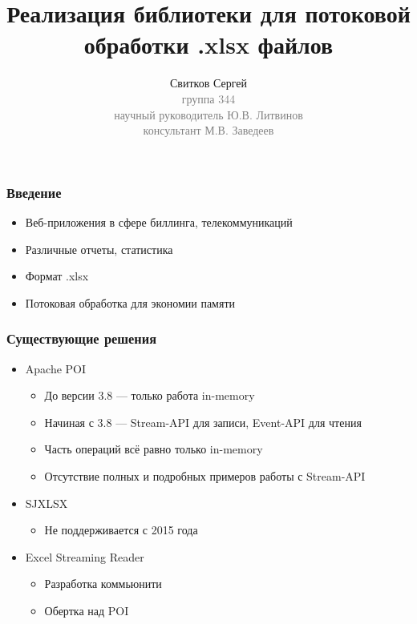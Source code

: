 \documentclass{beamer}
\begin{document}
\title{Реализация библиотеки для потоковой обработки .xlsx файлов}
\author{Свитков Сергей\\{\footnotesize\textcolor{gray}{группа 344\\научный руководитель Ю.В. Литвинов\\консультант М.В. Заведеев}}}
\frame{\titlepage}

\begin{frame}\frametitle{Введение}
\begin{itemize}
    \item Веб-приложения в сфере биллинга, телекоммуникаций
    \item Различные отчеты, статистика
    \item Формат .xlsx
    \item Потоковая обработка для экономии памяти
\end{itemize}
\end{frame}

\begin{frame}\frametitle{Существующие решения}
\begin{itemize}
    \item Apache POI
    \begin{itemize}
        \item До версии 3.8 --- только работа in-memory
        \item Начиная с 3.8 --- Stream-API для записи, Event-API для чтения
        \item Часть операций всё равно только in-memory
        \item Отсутствие полных и подробных примеров работы с Stream-API
    \end{itemize}
    \item SJXLSX
    \begin{itemize}
        \item Не поддерживается с 2015 года
    \end{itemize}
    \item Excel Streaming Reader
    \begin{itemize}
        \item Разработка коммьюнити
        \item Обертка над POI
    \end{itemize}
\end{itemize}
\end{frame}
\end{document}
